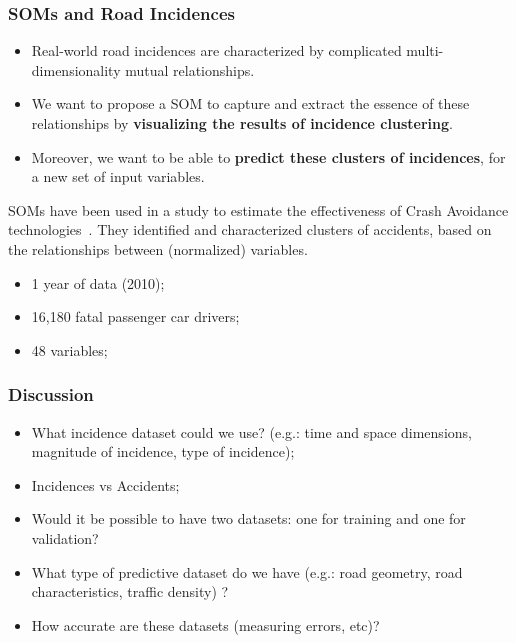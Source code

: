 \documentclass[hyperref={pdfpagelabels=true}]{beamer}
\begin{document}
\begin{frame}
\frametitle{SOMs and Road Incidences}
\begin{itemize}
\item Real-world road incidences are characterized by complicated multi-dimensionality mutual relationships.
\item We want to propose a SOM to capture and extract the essence of these relationships by \textbf{visualizing the results of incidence clustering}.
\item Moreover, we want to be able to \textbf{predict these clusters of incidences}, for a new set of input variables.
\end{itemize}
SOMs have been used in a study to estimate the effectiveness of Crash Avoidance technologies~\cite{crash}. They identified and characterized clusters of accidents, based on the relationships between (normalized) variables.
\begin{itemize}
\item <2-> 1 year of data (2010);
\item <3-> 16,180 fatal passenger car drivers;
\item <4-> 48 variables;
\end{itemize}
\end{frame}

\begin{frame}
\frametitle{Discussion}
\begin{itemize}
\item What incidence dataset could we use? (e.g.: time and space dimensions, magnitude of incidence, type of incidence);
\item Incidences vs Accidents;
\item Would it be possible to have two datasets: one for training and one for validation?%
\item What type of predictive dataset do we have (e.g.: road geometry, road characteristics, traffic density) ?
\item How accurate are these datasets (measuring errors, etc)?%
\end{itemize}
\end{frame}
\end{document}
